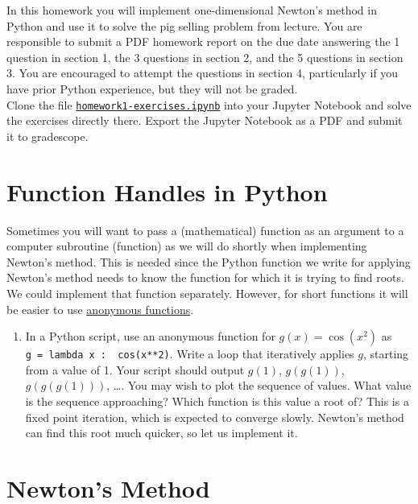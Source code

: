 \documentclass[letter]{article}
\newcommand{\setheader}[6]{
	\lhead{{\sc #1}\\{\sc #2}}%
	\rhead{
		{\bf #3} 
		\ifthenelse{\equal{#4}{}}{}{(#4)}\\
		{\bf #5} 
		\ifthenelse{\equal{#6}{}}{}{(#6)}%
	}
}
\begin{document}
	\setheader{APM348}{Homework 1}{Due: 5:59pm January 25}{}{}{}

In this homework you will implement one-dimensional Newton's method in Python and use it to solve the pig selling problem from lecture. You are responsible to submit a PDF homework report on the due date answering the 1 question in section 1, the 3 questions in section 2, and the 5 questions in section 3. You are encouraged to attempt the questions in section 4, particularly if you have prior Python experience, but they will not be graded. \\

Clone the file \href{https://utoronto.syzygy.ca/jupyter/user-redirect/git-pull?repo=https://github.com/bigfatbernie/IBLMathModeling&subPath=homeworks/homework1/homework1-exercises.ipynb}{\tt homework1-exercises.ipynb} into your Jupyter Notebook and solve the exercises directly there.
Export the Jupyter Notebook as a PDF and submit it to gradescope.


\section{Function Handles in Python}

Sometimes you will want to pass a (mathematical) function as an argument to a computer subroutine (function) as we will do shortly when implementing Newton's method. This is needed since the Python function we write for applying Newton's method needs to know the function for which it is trying to find roots. We could implement that function separately. However, for short functions it will be easier to use \href{https://www.w3schools.com/python/python_lambda.asp}{anonymous functions}.

\begin{enumerate}
\item In a Python script, use an anonymous function for $g(x) = \cos(x^2)$ as \\\verb|g = lambda x :  cos(x**2)|. Write a loop that iteratively applies $g$, starting from a value of 1. Your script should output $g(1)$, $g(g(1))$, $g(g(g(1)))$, \ldots . You may wish to plot the sequence of values. What value is the sequence approaching? Which function is this value a root of? This is a fixed point iteration, which is expected to converge slowly. Newton's method can find this root much quicker, so let us implement it.
\end{enumerate}

\section{Newton's Method}
\end{document}
